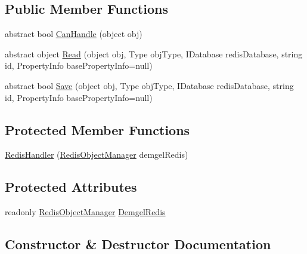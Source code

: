 \subsection*{Public Member Functions}
\begin{DoxyCompactItemize}
\item 
abstract bool \hyperlink{class_demgel_redis_1_1_object_manager_1_1_handlers_1_1_redis_handler_aa5026306847a86faaf9464f923c5cb96}{Can\+Handle} (object obj)
\item 
abstract object \hyperlink{class_demgel_redis_1_1_object_manager_1_1_handlers_1_1_redis_handler_a094629bfc66d785f22295cf406917214}{Read} (object obj, Type obj\+Type, I\+Database redis\+Database, string id, Property\+Info base\+Property\+Info=null)
\item 
abstract bool \hyperlink{class_demgel_redis_1_1_object_manager_1_1_handlers_1_1_redis_handler_aa22411cec0623a305ce794fa8201f086}{Save} (object obj, Type obj\+Type, I\+Database redis\+Database, string id, Property\+Info base\+Property\+Info=null)
\end{DoxyCompactItemize}
\subsection*{Protected Member Functions}
\begin{DoxyCompactItemize}
\item 
\hyperlink{class_demgel_redis_1_1_object_manager_1_1_handlers_1_1_redis_handler_ac589e0333db79219fd985f02d382bd9f}{Redis\+Handler} (\hyperlink{class_demgel_redis_1_1_object_manager_1_1_redis_object_manager}{Redis\+Object\+Manager} demgel\+Redis)
\end{DoxyCompactItemize}
\subsection*{Protected Attributes}
\begin{DoxyCompactItemize}
\item 
readonly \hyperlink{class_demgel_redis_1_1_object_manager_1_1_redis_object_manager}{Redis\+Object\+Manager} \hyperlink{class_demgel_redis_1_1_object_manager_1_1_handlers_1_1_redis_handler_a0de0f348f9291af190f2a452fc10acfe}{Demgel\+Redis}
\end{DoxyCompactItemize}


\subsection{Constructor \& Destructor Documentation}
\hypertarget{class_demgel_redis_1_1_object_manager_1_1_handlers_1_1_redis_handler_ac589e0333db79219fd985f02d382bd9f}{}
